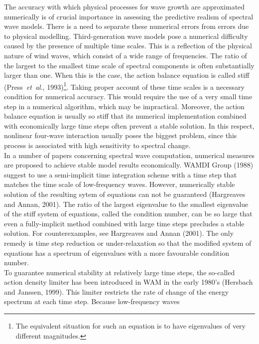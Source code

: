 \documentclass[12pt]{book}
\begin{document}
The accuracy with which
physical processes for wave growth are approximated numerically is of crucial importance in assessing the
predictive realism of spectral wave models. There is a
need to separate these numerical errors from errors due to physical modelling.
Third-generation wave models pose a numerical difficulty caused by the presence of
multiple time scales. This is
a reflection of the physical nature of wind waves, which consist of a wide
range of frequencies. The ratio of the largest to the smallest time scale of spectral components is often substantially
larger than one. When this is the case, the action balance equation is called stiff
(Press~{\it et~al}., 1993)\footnote{The equivalent situation for such an equation is to have eigenvalues
of very different magnitudes.}. Taking proper account of these time scales is a
necessary condition for numerical accuracy. This would require
the use of a very small time step in a numerical algorithm, which may be
impractical. Moreover, the action balance equation is usually so
stiff that its numerical implementation combined with economically large
time steps often prevent a stable solution. In this respect, nonlinear four-wave interaction
usually poses the biggest problem, since this process is associated with
high sensitivity to spectral change.
\\[2ex]
\noindent
In a number of papers concerning spectral wave computation, numerical measures are proposed to achieve stable model
results economically.
WAMDI Group (1988) suggest to use a semi-implicit time integration scheme with a time step that matches the time scale of
low-frequency waves.
However, numerically stable solution of the resulting sytem of equations can not be guaranteed
(Hargreaves and Annan, 2001).
The ratio of the largest eigenvalue to the smallest eigenvalue of the stiff system
of equations, called the condition number, can be so large that even a fully-implicit method combined with large
time steps precludes a stable solution. For counterexamples, see Hargreaves and Annan (2001).
The only remedy is time step reduction or under-relaxation so that the modified system of
equations has a spectrum of eigenvalues with a more favourable condition number.
\nocite{Har01A}
\\[2ex]
\noindent
To guarantee numerical stability at relatively large time steps, the so-called action density limiter has been introduced
in WAM in the early 1980's (Hersbach and Janssen, 1999). This limiter restricts the rate of change of the energy
spectrum at each time step. Because low-frequency waves
\end{document}
